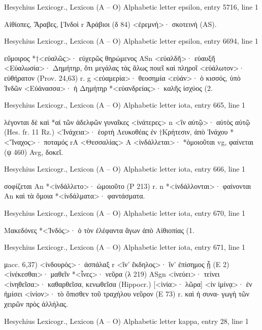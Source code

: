 \documentclass[12pt,letterpaper,twoside,final]{memoir}
\begin{document}
\begin{greek}
Hesychius Lexicogr., Lexicon (Α – Ο) 
Alphabetic letter epsilon, entry 5716, line 1

                            Αἰθίοπες, Ἄραβες, ⌊Ἰνδοὶ r Ἀράβιοι (δ 84) 
<ἐρεμνή>· σκοτεινή (AS). 



Hesychius Lexicogr., Lexicon (Α – Ο) 
Alphabetic letter epsilon, entry 6694, line 1

                          εὔμοιρος 
*†<εὐαλῶς>· εὐχερῶς θηρώμενος ASn 
<εὐαλδῆ>· εὐαυξῆ 
<Εὐαλωσία>· Δημήτηρ, ὅτι μεγάλας τὰς ἅλως ποιεῖ καὶ πληροῖ 
<εὐάλωτον>· εὐθήρατον (Prov. 24,63) r. g 
<εὐαμερία>· θεοσημία 
<εὐάν>· ὁ κισσός, ὑπὸ Ἰνδῶν 
<Εὐάνασσα>· ἡ Δημήτηρ 
*<εὐανδρείας>· καλῆς ἰσχύος (2. 



Hesychius Lexicogr., Lexicon (Α – Ο) 
Alphabetic letter iota, entry 665, line 1

                                              λέγονται δὲ καὶ *αἱ τῶν 
 ἀδελφῶν γυναῖκες <ἰνάτερες> n 
<ἳν αὐτῷ>· αὐτὸς αὐτῷ (Hes. fr. 11 Rz.) 
<Ἰνάχεια>· ἑορτὴ Λευκοθέας ἐν †Κρήτεσιν, ἀπὸ Ἰνάχου 
*<Ἴναχος>· ποταμός rA <Θεσσαλίας> A 
<ἰνδάλλεται>· *ὁμοιοῦται vg, φαίνεται (ψ 460) Avg, δοκεῖ. 



Hesychius Lexicogr., Lexicon (Α – Ο) 
Alphabetic letter iota, entry 666, line 1

                             σοφίζεται An 
*<ἰνδάλλετο>· ὡμοιοῦτο (Ρ 213) r. n 
*<ἰνδάλλονται>· φαίνονται An καὶ τὰ ὅμοια 
*<ἰνδάλματα>· φαντάσματα. 



Hesychius Lexicogr., Lexicon (Α – Ο) 
Alphabetic letter iota, entry 670, line 1

                              Μακεδόνες 
*<Ἰνδός>· ὁ τὸν ἐλέφαντα ἄγων ἀπὸ Αἰθιοπίας (1. 



Hesychius Lexicogr., Lexicon (Α – Ο) 
Alphabetic letter iota, entry 671, line 1

                                                                      μacc. 6,37) 
<ἰνδουρός>· ἀσπάλαξ r 
<ἵν' ἔκδηλος>· ἵν' ἐπίσημος ᾖ (Ε 2) 
<ἰνέκεσθαι>· μαθεῖν 
*<ἶνες>· νεῦρα (λ 219) ASgn   
<ἰνεύει>· τείνει 
<ἰνηθεῖσα>· καθαρθεῖσα, κενωθεῖσα (Hippocr.) 
[<ἱνία>· λῶρα] 
<ἰν ἱμίνᾳ>· ἐν ἡμίσει 
<ἰνίον>· τὸ ὄπισθεν τοῦ τραχήλου νεῦρον (Ε 73) r. καὶ ἡ συνα-
 γωγὴ τῶν χειρῶν πρὸς ἀλλήλας. 



Hesychius Lexicogr., Lexicon (Α – Ο) 
Alphabetic letter kappa, entry 28, line 1


\end{greek}
\end{document}
